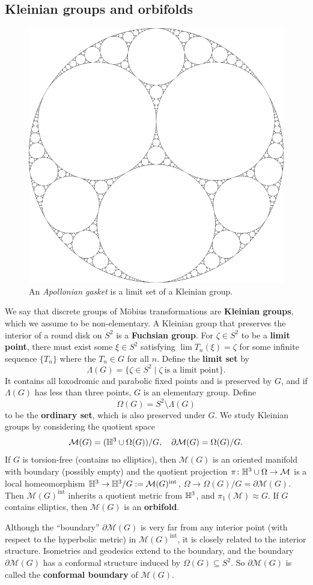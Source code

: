 \subsection{Kleinian groups and orbifolds}
\begin{figure}[b]
\centering
 \includegraphics[width=0.4\linewidth]{figures/hyp3.png}
 \caption{An \textit{Apollonian gasket} is a limit set of a Kleinian group.} 
\end{figure}
We say that discrete groups of M\"obius transformations are \textbf{Kleinian groups}, which we assume to be non-elementary. A Kleinian group that preserves the interior of a round disk on $S^2$ is a \textbf{Fuchsian group}. For $\zeta \in S^2$ to be a \textbf{limit point}, there must exist some $\xi \in S^2$ satisfying $\lim T_n (\xi)=\zeta$ for some infinite sequence $\{T_n \} $ where the $T_n \in G$ for all $n$. Define the \textbf{limit set} by \[
    \Lambda(G)= \{\zeta \in S^2\mid \zeta \ \text{is a limit point} \} .
\] It contains all loxodromic and parabolic fixed points and is preserved by $G$, and if $\Lambda(G)$ has less than three points, $G$ is an elementary group. 
Define \[
\Omega(G)= S^2 \setminus \Lambda(G) 
\] to be the \textbf{ordinary set}, which is also preserved under $G$. We study Kleinian groups by considering the quotient space \[
\mathcal{M} (G)=(\mathbb{H}^3 \cup \Omega(G)) / G,\quad \partial \mathcal M(G)= \Omega(G) /G.
\] If $G$ is torsion-free (contains no elliptics), then $\mathcal{M} (G)$ is an oriented manifold with boundary (possibly empty) and the quotient projection $\pi \colon \mathbb{H}^3 \cup  \Omega \to \mathcal{M} $ is a local homeomorphism $\mathbb{H}^3 \to \mathbb{H}^3 / G:= \mathcal{M} (G)^{\text{int}}$, $\Omega \to \Omega(G) /G = \partial \mathcal{M} (G)$. Then $\mathcal{M} (G)^{\text{int}}$ inherits a quotient metric from $\mathbb{H}^3$, and $\pi_1(\mathcal{M} )\approx G$. If $G$ contains elliptics, then $\mathcal{M} (G)$ is an \textbf{orbifold}. 

Although the ``boundary'' $\partial \mathcal{M} (G)$ is very far from any interior point (with respect to the hyperbolic metric) in $\mathcal{M} (G)^{\text{int} }$, it is closely related to the interior structure. Isometries and geodesics extend to the boundary, and the boundary $\partial \mathcal{M} (G)$ has a conformal structure induced by $\Omega(G) \subseteq S^2$. So $\partial \mathcal{M} (G)$ is called the \textbf{conformal boundary} of $\mathcal{M} (G)$.

